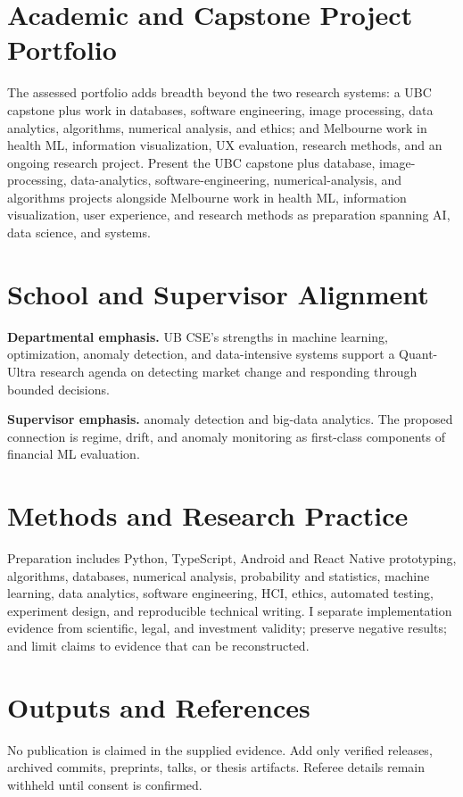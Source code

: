 \documentclass[11pt]{article}
\begin{document}
\section*{Academic and Capstone Project Portfolio}
The assessed portfolio adds breadth beyond the two research systems: a UBC capstone plus work in databases, software engineering, image processing, data analytics, algorithms, numerical analysis, and ethics; and Melbourne work in health ML, information visualization, UX evaluation, research methods, and an ongoing research project. Present the UBC capstone plus database, image-processing, data-analytics, software-engineering, numerical-analysis, and algorithms projects alongside Melbourne work in health ML, information visualization, user experience, and research methods as preparation spanning AI, data science, and systems.

\section*{School and Supervisor Alignment}
\textbf{Departmental emphasis.} UB CSE's strengths in machine learning, optimization, anomaly detection, and data-intensive systems support a Quant-Ultra research agenda on detecting market change and responding through bounded decisions.

\textbf{Supervisor emphasis.} anomaly detection and big-data analytics. The proposed connection is regime, drift, and anomaly monitoring as first-class components of financial ML evaluation.

\section*{Methods and Research Practice}
Preparation includes Python, TypeScript, Android and React Native prototyping, algorithms, databases, numerical analysis, probability and statistics, machine learning, data analytics, software engineering, HCI, ethics, automated testing, experiment design, and reproducible technical writing. I separate implementation evidence from scientific, legal, and investment validity; preserve negative results; and limit claims to evidence that can be reconstructed.

\section*{Outputs and References}
No publication is claimed in the supplied evidence. Add only verified releases, archived commits, preprints, talks, or thesis artifacts. Referee details remain withheld until consent is confirmed.
\end{document}

